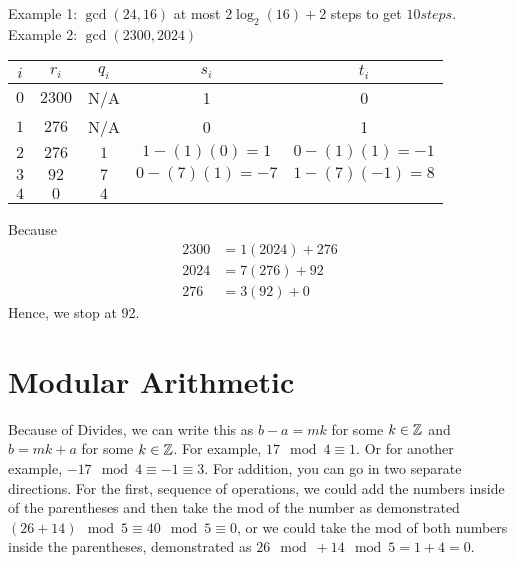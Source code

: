 Example 1: $\gcd(24,16)$ at most $2\log_2(16) + 2$ steps to get $10 steps$. \\

Example 2: $\gcd(2300, 2024)$

\begin{table}[htbp]
    \begin{tabular}{c|c|c|c|c}
        $i$ & $r_i$        & $q_i$ & $s_i$             & $t_i$             \\ \hline
        $0$ & $2300$       & N/A   & 1                 & 0                 \\
        $1$ & $276$        & N/A   & 0                 & 1                 \\ \hline
        $2$ & $276$        & $1$   & $1 - (1)(0) = 1$  & $0 - (1)(1) = -1$ \\ \hline
        $3$ & $\boxed{92}$ & $7$   & $0 - (7)(1) = -7$ & $1 - (7)(-1) = 8$ \\
        $4$ & $0$          & $4$   &                   &
    \end{tabular}
\end{table}

Because \begin{align*}
    2300 & = 1(2024) + 276     \\
    2024 & = 7(276) + 92       \\
    276  & = \boxed{3(92) + 0}
\end{align*} Hence, we stop at 92. \\

\section{Modular Arithmetic}


Because of \gls{Divides}, we can write this as $b - a = mk$ for some $k \in \mathbb{Z}$ and $b = mk + a$ for some $k \in \mathbb{Z}$. For example, $17\mod 4 \equiv 1$. Or for another example, $-17\mod 4 \equiv -1 \equiv 3$. For addition, you can go in two separate directions. For the first, sequence of operations, we could add the numbers inside of the parentheses and then take the mod of the number as demonstrated $(26 + 14)\mod 5 \equiv 40 \mod 5 \equiv 0$, or we could take the mod of both numbers inside the parentheses, demonstrated as $26\mod + 14\mod 5 = 1 + 4 = 0$. \\

